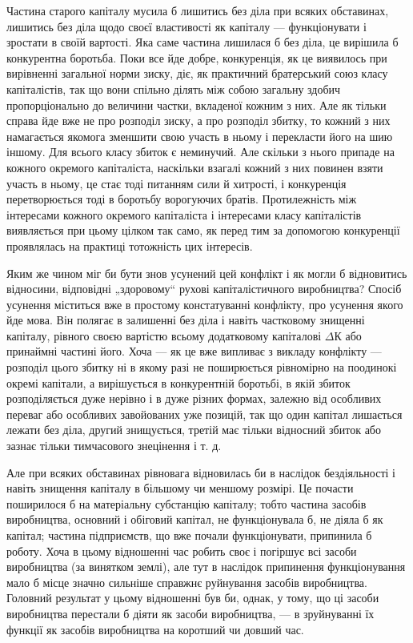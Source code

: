 Частина старого капіталу мусила б лишитись без діла при
всяких обставинах, лишитись без діла щодо своєї властивості як
капіталу — функціонувати і зростати в своїй вартості. Яка саме
частина лишилася б без діла, це вирішила б конкурентна боротьба.
Поки все йде добре, конкуренція, як це виявилось при
вирівненні загальної норми зиску, діє, як практичний братерський
союз класу капіталістів, так що вони спільно ділять між собою загальну
здобич пропорціонально до величини частки, вкладеної
кожним з них. Але як тільки справа йде вже не про розподіл
зиску, а про розподіл збитку, то кожний з них намагається
якомога зменшити свою участь в ньому і перекласти його на
шию іншому. Для всього класу збиток є неминучий. Але скільки
з нього припаде на кожного окремого капіталіста, наскільки
взагалі кожний з них повинен взяти участь в ньому, це стає
тоді питанням сили й хитрості, і конкуренція перетворюється
тоді в боротьбу ворогуючих братів. Протилежність між інтересами
кожного окремого капіталіста і інтересами класу капіталістів виявляється
при цьому цілком так само, як перед тим за допомогою
конкуренції проявлялась на практиці тотожність цих інтересів.

Яким же чином міг би бути знов усунений цей конфлікт
і як могли б відновитись відносини, відповідні „здоровому“
рухові капіталістичного виробництва? Спосіб усунення міститься
вже в простому констатуванні конфлікту, про усунення якого
йде мова. Він полягає в залишенні без діла і навіть частковому
знищенні капіталу, рівного своєю вартістю всьому додатковому
капіталові $ΔК$ або принаймні частині його. Хоча — як
це вже випливає з викладу конфлікту — розподіл цього збитку
ні в якому разі не поширюється рівномірно на поодинокі окремі
капітали, а вирішується в конкурентній боротьбі, в якій збиток
розподіляється дуже нерівно і в дуже різних формах, залежно
від особливих переваг або особливих завойованих уже позицій,
так що один капітал лишається лежати без діла, другий знищується,
третій має тільки відносний збиток або зазнає тільки
тимчасового знецінення і т. д.

Але при всяких обставинах рівновага відновилась би в наслідок
бездіяльності і навіть знищення капіталу в більшому чи
меншому розмірі. Це почасти поширилося б на матеріальну
субстанцію капіталу; тобто частина засобів виробництва, основний
і обіговий капітал, не функціонувала б, не діяла б як капітал;
частина підприємств, що вже почали функціонувати, припинила
б роботу. Хоча в цьому відношенні час робить своє
і погіршує всі засоби виробництва (за винятком землі), але тут
в наслідок припинення функціонування мало б місце значно
сильніше справжнє руйнування засобів виробництва. Головний
результат у цьому відношенні був би, однак, у тому, що ці засоби
виробництва перестали б діяти як засоби виробництва, — в зруйнуванні
їх функції як засобів виробництва на коротший чи довший
час.
